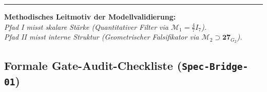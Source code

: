 \documentclass[11pt,a4paper]{article}
\begin{document}
\vspace{1.2em}
\hrule
\vspace{1.5em}

\begin{center}
\colorbox{gray!10}{
    \parbox{0.95\textwidth}{
        \centering\vspace{0.4em}
        \textbf{Methodisches Leitmotiv der Modellvalidierung:}\\[0.2em]
        \emph{Pfad I misst skalare Stärke (Quantitativer Filter via $\mathcal{M}_1 = \frac{4}{7}I_7$).}\\
        \emph{Pfad II misst interne Struktur (Geometrischer Falsifikator via $\mathcal{M}_2 \supset \mathbf{27}_{G_2}$).}
        \vspace{0.4em}
    }
}
\end{center}

\vspace{1.5em}

\subsection*{Formale Gate-Audit-Checkliste (\texttt{Spec-Bridge-01})}
\vspace{-0.5em}
\end{document}
